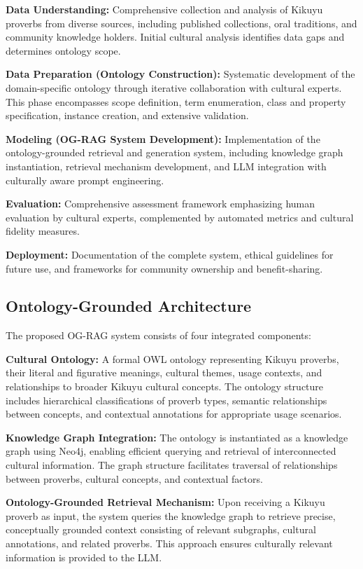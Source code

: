 \documentclass[
]{ceurart}
\begin{document}
\textbf{Data Understanding:} Comprehensive collection and analysis of Kikuyu proverbs from diverse sources, including published collections, oral traditions, and community knowledge holders. Initial cultural analysis identifies data gaps and determines ontology scope.

\textbf{Data Preparation (Ontology Construction):} Systematic development of the domain-specific ontology through iterative collaboration with cultural experts. This phase encompasses scope definition, term enumeration, class and property specification, instance creation, and extensive validation.

\textbf{Modeling (OG-RAG System Development):} Implementation of the ontology-grounded retrieval and generation system, including knowledge graph instantiation, retrieval mechanism development, and LLM integration with culturally aware prompt engineering.

\textbf{Evaluation:} Comprehensive assessment framework emphasizing human evaluation by cultural experts, complemented by automated metrics and cultural fidelity measures.

\textbf{Deployment:} Documentation of the complete system, ethical guidelines for future use, and frameworks for community ownership and benefit-sharing.

\subsection{Ontology-Grounded Architecture}

The proposed OG-RAG system consists of four integrated components:

\textbf{Cultural Ontology:} A formal OWL ontology representing Kikuyu proverbs, their literal and figurative meanings, cultural themes, usage contexts, and relationships to broader Kikuyu cultural concepts. The ontology structure includes hierarchical classifications of proverb types, semantic relationships between concepts, and contextual annotations for appropriate usage scenarios.

\textbf{Knowledge Graph Integration:} The ontology is instantiated as a knowledge graph using Neo4j, enabling efficient querying and retrieval of interconnected cultural information. The graph structure facilitates traversal of relationships between proverbs, cultural concepts, and contextual factors.

\textbf{Ontology-Grounded Retrieval Mechanism:} Upon receiving a Kikuyu proverb as input, the system queries the knowledge graph to retrieve precise, conceptually grounded context consisting of relevant subgraphs, cultural annotations, and related proverbs. This approach ensures culturally relevant information is provided to the LLM.
\end{document}
